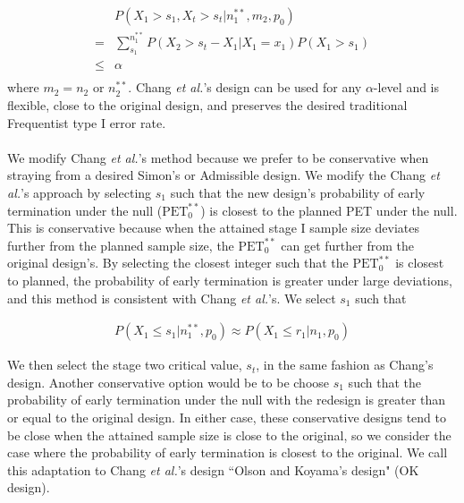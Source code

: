 \documentclass[12pt]{report}\usepackage[]{graphicx}\usepackage[]{color}
\newlength{\li}\setlength{\li}{14.48pt}
\newlength{\di}\setlength{\di}{-3.5mm}
\begin{document}
\begin{equation}
\begin{aligned}
& P(X_1 > s_1, X_t > s_t | n_1^{\ast\ast}, m_2, p_0) \\
= & \sum_{s_1}^{n_1^{\ast\ast}} P(X_2 > s_t - X_1 | X_1 = x_1) P(X_1 > s_1) \\
 \leq & \alpha \\
\end{aligned}
\end{equation}
where $m_2 = n_2$ or $n_2^{\ast\ast}$. 
Chang \textit{et al.}'s design can be used for any $\alpha$-level and is flexible, close to the original design, and preserves the desired traditional Frequentist type I error rate. \\
\\
\indent We modify Chang \textit{et al.}'s method because we prefer to be conservative when straying from a desired Simon's or Admissible design. We modify the Chang \textit{et al.}'s approach by selecting $s_1$ such that the new design's probability of early termination under the null ($\mbox{PET}_0^{\ast\ast}$) is closest to the planned PET under the null. This is conservative because when the attained stage I sample size deviates further from the planned sample size, the $\mbox{PET}_0^{\ast\ast}$ can get further from the original design's. By selecting the closest integer such that the $\mbox{PET}_0^{\ast\ast}$ is closest to planned, the probability of early termination is greater under large deviations, and this method is consistent with Chang \textit{et al.}'s. We select $s_1$ such that 

\begin{equation}
\begin{aligned}
P(X_1 \leq s_1 | n_1^{\ast\ast}, p_0) \approx P(X_1 \leq r_1 | n_1, p_0)
\end{aligned}
\end{equation}

We then select the stage two critical value, $s_t$, in the same fashion as Chang's design. Another conservative option would be to be choose $s_1$ such that the probability of early termination under the null with the redesign is greater than or equal to the original design. In either case, these conservative designs tend to be close when the attained sample size is close to the original, so we consider the case where the probability of early termination is closest to the original. We call this adaptation to Chang \textit{et al.}'s design ``Olson and Koyama's design" (OK design). 
\end{document}

